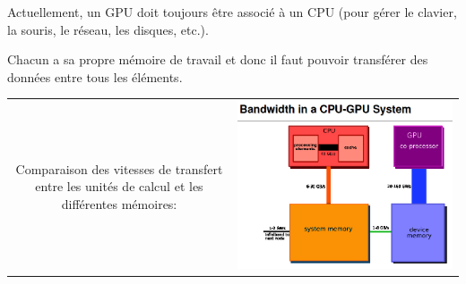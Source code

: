 \documentclass[usenames,dvipsnames]{beamer}
\begin{document}
\begin{frame}
	Actuellement, un GPU doit toujours être associé à un CPU (pour gérer le clavier, la souris, le réseau, les disques, etc.).
	
	\vfill
	 Chacun a sa propre mémoire de travail et donc il faut pouvoir transférer des données entre tous les éléments.
	 
	 \vfill
\begin{tabular}{cc}
	\begin{minipage}[b]{0.4\textwidth}
	Comparaison des vitesses de transfert entre les unités de calcul et les différentes mémoires:
    \end{minipage}&
	\includegraphics{../../Images/GpuCpuBandwidth}
\end{tabular}
\end{frame}
	
\end{document}
